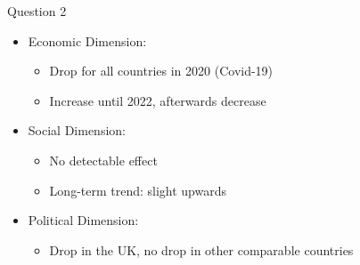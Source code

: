 \documentclass{beamer}
\begin{document}
\begin{frame}{Question 2}
    \begin{itemize}
        \item Economic Dimension:
        \begin{itemize}
            \item Drop for all countries in 2020 (Covid-19)
             \item Increase until 2022, afterwards decrease
        \end{itemize}
        \item Social Dimension:
        \begin{itemize}
            \item No detectable effect
            \item Long-term trend: slight upwards 
        \end{itemize}
        \item Political Dimension:
        \begin{itemize}
            \item Drop in the UK, no drop in other comparable countries
        \end{itemize}
    \end{itemize}
\end{frame}


 
 
\end{document}
